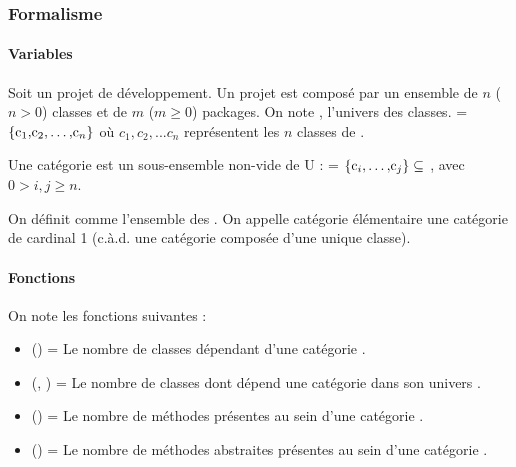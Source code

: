 \documentclass{scrartcl}
\begin{document}
    
\subsubsection{Formalisme}
\label{martin:formalism}

    \paragraph{Variables}Soit \project{} un projet de développement. Un projet \project{} est composé par un ensemble de $n$ ($n > 0$) classes et de $m$ ($m \geq 0$) packages. On note \classUniverse{}, l'univers des classes. \classUniverse{} = $\{\class{}_1, \class{}_2, \dots, \class{}_n\}$ où $c_1, c_2, ... c_n$ représentent les $n$ classes de \project.

    Une catégorie \category{} est un sous-ensemble non-vide de U : \category{} = $ \{\class{}_i, \dots, \class{}_j\} \subseteq$ \classUniverse{}, avec $0 > i, j \geq n$.

    On définit \categoryUniverse{} comme l'ensemble des \category{}. On appelle catégorie élémentaire une catégorie de cardinal 1 (c.à.d. une catégorie composée d'une unique classe).

    \paragraph{Fonctions}On note les fonctions suivantes :
    \begin{itemize}
        \item \dependantClasses{}(\category{}) = Le nombre de classes dépendant d'une catégorie \category{}.
        \item \dependedClasses{}(\category{}, \categoryUniverse{}) = Le nombre de classes dont dépend une catégorie \category{} dans son univers \categoryUniverse{}.
        \item \numberOfMethod{}(\category{}) = Le nombre de méthodes présentes au sein d'une catégorie \category{}.
        \item \numberOfabstractMethod{}(\category{}) = Le nombre de méthodes abstraites présentes au sein d'une catégorie \category{}.
    \end{itemize}
\end{document}
